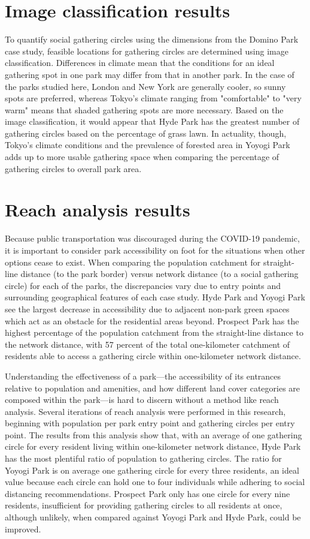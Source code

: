 \begin{multicols}{2}
\section{Image classification results}
To quantify social gathering circles using the dimensions from the Domino Park case study, feasible locations for gathering circles are determined using image classification. Differences in climate mean that the conditions for an ideal gathering spot in one park may differ from that in another park. In the case of the parks studied here, London and New York are generally cooler, so sunny spots are preferred, whereas Tokyo's climate ranging from "comfortable" to "very warm" means that shaded gathering spots are more necessary. Based on the image classification, it would appear that Hyde Park has the greatest number of gathering circles based on the percentage of grass lawn. In actuality, though, Tokyo's climate conditions and the prevalence of forested area in Yoyogi Park adds up to more usable gathering space when comparing the percentage of gathering circles to overall park area. 

\section{Reach analysis results}
Because public transportation was discouraged during the COVID-19 pandemic, it is important to consider park accessibility on foot for the situations when other options cease to exist. When comparing the population catchment for straight-line distance (to the park border) versus network distance (to a social gathering circle) for each of the parks, the discrepancies vary due to entry points and surrounding geographical features of each case study. Hyde Park and Yoyogi Park see the largest decrease in accessibility due to adjacent non-park green spaces which act as an obstacle for the residential areas beyond. Prospect Park has the highest percentage of the population catchment from the straight-line distance to the network distance, with 57 percent of the total one-kilometer catchment of residents able to access a gathering circle within one-kilometer network distance.

Understanding the effectiveness of a park---the accessibility of its entrances relative to population and amenities, and how different land cover categories are composed within the park---is hard to discern without a method like reach analysis. Several iterations of reach analysis were performed in this research, beginning with population per park entry point and gathering circles per entry point. The results from this analysis show that, with an average of one gathering circle for every resident living within one-kilometer network distance, Hyde Park has the most plentiful ratio of population to gathering circles. The ratio for Yoyogi Park is on average one gathering circle for every three residents, an ideal value because each circle can hold one to four individuals while adhering to social distancing recommendations. Prospect Park only has one circle for every nine residents, insufficient for providing gathering circles to all residents at once, although unlikely, when compared against Yoyogi Park and Hyde Park, could be improved.


\end{multicols}
